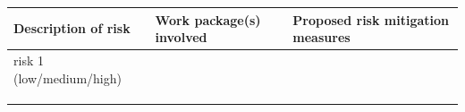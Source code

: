 \documentclass[]{article}
\begin{document}
\begin{longtable}[]{@{}lll@{}}
\toprule
\begin{minipage}[b]{0.26\columnwidth}\raggedright
Description of risk\strut
\end{minipage} & \begin{minipage}[b]{0.28\columnwidth}\raggedright
Work package(s) involved\strut
\end{minipage} & \begin{minipage}[b]{0.37\columnwidth}\raggedright
Proposed risk mitigation measures\strut
\end{minipage}\tabularnewline
\midrule
\endhead
\begin{minipage}[t]{0.26\columnwidth}\raggedright
risk 1 (low/medium/high)\strut
\end{minipage} & \begin{minipage}[t]{0.28\columnwidth}\raggedright
\strut
\end{minipage} & \begin{minipage}[t]{0.37\columnwidth}\raggedright
\strut
\end{minipage}\tabularnewline
\begin{minipage}[t]{0.26\columnwidth}\raggedright
\strut
\end{minipage} & \begin{minipage}[t]{0.28\columnwidth}\raggedright
\strut
\end{minipage} & \begin{minipage}[t]{0.37\columnwidth}\raggedright
\strut
\end{minipage}\tabularnewline
\begin{minipage}[t]{0.26\columnwidth}\raggedright
\strut
\end{minipage} & \begin{minipage}[t]{0.28\columnwidth}\raggedright
\strut
\end{minipage} & \begin{minipage}[t]{0.37\columnwidth}\raggedright
\strut
\end{minipage}\tabularnewline
\begin{minipage}[t]{0.26\columnwidth}\raggedright
\strut
\end{minipage} & \begin{minipage}[t]{0.28\columnwidth}\raggedright
\strut
\end{minipage} & \begin{minipage}[t]{0.37\columnwidth}\raggedright
\strut
\end{minipage}\tabularnewline
\bottomrule
\end{longtable}
\end{document}
